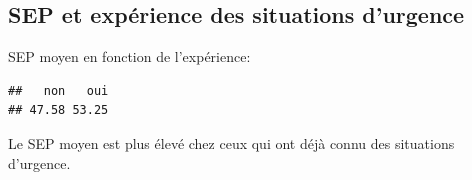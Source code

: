 \documentclass[12pt,english,french]{article}\usepackage{graphicx, color}
\makeatletter
\newenvironment{kframe}{%
 \def\at@end@of@kframe{}%
 \ifinner\ifhmode%
  \def\at@end@of@kframe{\end{minipage}}%
  \begin{minipage}{\columnwidth}%
 \fi\fi%
 \def\FrameCommand##1{\hskip\@totalleftmargin \hskip-\fboxsep
 \colorbox{shadecolor}{##1}\hskip-\fboxsep
     \hskip-\linewidth \hskip-\@totalleftmargin \hskip\columnwidth}%
 \MakeFramed {\advance\hsize-\width
   \@totalleftmargin\z@ \linewidth\hsize
   \@setminipage}}%
 {\par\unskip\endMakeFramed%
 \at@end@of@kframe}
\newenvironment{knitrout}{}{} %
\makeatother
\begin{document}
\subsection{SEP et expérience des situations d'urgence}
SEP moyen en fonction de l'expérience:
\begin{knitrout}
\color{fgcolor}\begin{kframe}
\begin{verbatim}
##   non   oui 
## 47.58 53.25
\end{verbatim}
\end{kframe}
\end{knitrout}

Le SEP moyen est plus élevé chez ceux qui ont déjà connu des situations d'urgence.
\end{document}
